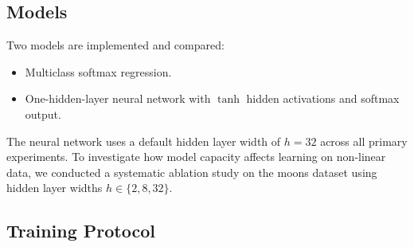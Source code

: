 \documentclass[sigconf,screen,nonacm]{acmart}
\begin{document}
\subsection{Models}
Two models are implemented and compared:
\begin{itemize}[leftmargin=*]
    \item Multiclass softmax regression.
    \item One-hidden-layer neural network with $\tanh$ hidden activations and softmax output.
\end{itemize}
The neural network uses a default hidden layer width of $h = 32$ across all primary experiments.
To investigate how model capacity affects learning on non-linear data, we conducted a systematic ablation study on the moons dataset using hidden layer widths $h \in \{2, 8, 32\}$.

\subsection{Training Protocol}
\end{document}
